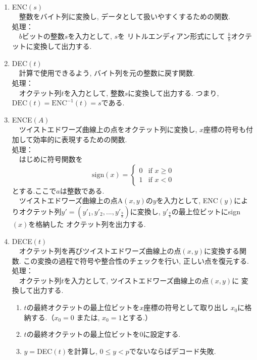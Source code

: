 \\
\begin{enumerate}
  \item ENC$(s)$\\
  　整数をバイト列に変換し, データとして扱いやすくするための関数.\\
  処理：\\
  　$b$ビットの整数$s$を入力として, $s$を リトルエンディアン形式にして
  $\tfrac{b}{8}$オクテットに変換して出力する.
  \item DEC$(t)$\\
  　計算で使用できるよう, バイト列を元の整数に戻す関数.\\
  処理：\\
  　オクテット列$t$を入力として, 整数$s$に変換して出力する.
  つまり, $\mathrm{DEC}(t)=\mathrm{ENC}^{-1}(t)=s$である.
  \item ENCE$(A)$\\
  　ツイストエドワーズ曲線上の点をオクテット列に変換し, 
  $x$座標の符号も付加して効率的に表現するための関数.\\
  処理：\\
  　はじめに符号関数を
  \[
    \text{sign}(x) =
    \begin{cases}
    0 & \text{if } x \geq 0 \\
    1 & \text{if } x < 0
    \end{cases}
  \]
  とする.ここで$a$は整数である.\\
  　ツイストエドワーズ曲線上の点A$(x,y)$の$y$を入力として, 
  ENC$(y)$によりオクテット列$y'=(y'_1,y'_2,...,y'_\frac{b}{8})$に変換し, 
  $y'_\frac{b}{8}$の最上位ビットにsign$(x)$を格納した
  オクテット列を出力する.
  \item DECE$(t)$\\
  　オクテット列を再びツイストエドワーズ曲線上の点$(x, y)$に変換する関数.
  この変換の過程で符号や整合性のチェックを行い, 正しい点を復元する.\\
  処理：\\
  　オクテット列$t$を入力として, ツイストエドワーズ曲線上の点$(x,y)$に
  変換して出力する.
  \begin{enumerate}
    \item $t$の最終オクテットの最上位ビットを$x$座標の符号として取り出し
    $x_0$に格納する.（$x_0=0$ または, $x_0=1$とする.）
    \item $t$の最終オクテットの最上位ビットを0に設定する.
    \item $y=$DEC$(t)$を計算し, $0\leq y<p$でないならばデコード失敗.

\end{enumerate}
\end{enumerate}
